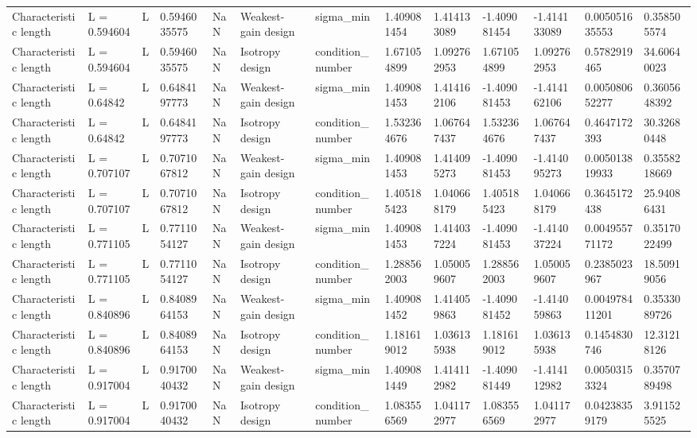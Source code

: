 \begin{tabular}{@{}lllllllllllll@{}}
Characteristic length & L = 0.594604 & L & 0.5946035575 & NaN & Weakest-gain design & sigma\_min & 1.409081454 & 1.414133089 & -1.409081454 & -1.414133089 & 0.005051635553 & 0.358505574 \\
Characteristic length & L = 0.594604 & L & 0.5946035575 & NaN & Isotropy design & condition\_number & 1.671054899 & 1.092762953 & 1.671054899 & 1.092762953 & 0.5782919465 & 34.60640023 \\
Characteristic length & L = 0.64842 & L & 0.6484197773 & NaN & Weakest-gain design & sigma\_min & 1.409081453 & 1.414162106 & -1.409081453 & -1.414162106 & 0.005080652277 & 0.3605648392 \\
Characteristic length & L = 0.64842 & L & 0.6484197773 & NaN & Isotropy design & condition\_number & 1.532364676 & 1.067647437 & 1.532364676 & 1.067647437 & 0.4647172393 & 30.32680448 \\
Characteristic length & L = 0.707107 & L & 0.7071067812 & NaN & Weakest-gain design & sigma\_min & 1.409081453 & 1.414095273 & -1.409081453 & -1.414095273 & 0.005013819933 & 0.3558218669 \\
Characteristic length & L = 0.707107 & L & 0.7071067812 & NaN & Isotropy design & condition\_number & 1.405185423 & 1.040668179 & 1.405185423 & 1.040668179 & 0.3645172438 & 25.94086431 \\
Characteristic length & L = 0.771105 & L & 0.7711054127 & NaN & Weakest-gain design & sigma\_min & 1.409081453 & 1.414037224 & -1.409081453 & -1.414037224 & 0.004955771172 & 0.3517022499 \\
Characteristic length & L = 0.771105 & L & 0.7711054127 & NaN & Isotropy design & condition\_number & 1.288562003 & 1.050059607 & 1.288562003 & 1.050059607 & 0.2385023967 & 18.50919056 \\
Characteristic length & L = 0.840896 & L & 0.8408964153 & NaN & Weakest-gain design & sigma\_min & 1.409081452 & 1.414059863 & -1.409081452 & -1.414059863 & 0.004978411201 & 0.3533089726 \\
Characteristic length & L = 0.840896 & L & 0.8408964153 & NaN & Isotropy design & condition\_number & 1.181619012 & 1.036135938 & 1.181619012 & 1.036135938 & 0.1454830746 & 12.31218126 \\
Characteristic length & L = 0.917004 & L & 0.9170040432 & NaN & Weakest-gain design & sigma\_min & 1.409081449 & 1.414112982 & -1.409081449 & -1.414112982 & 0.00503153324 & 0.3570789498 \\
Characteristic length & L = 0.917004 & L & 0.9170040432 & NaN & Isotropy design & condition\_number & 1.083556569 & 1.041172977 & 1.083556569 & 1.041172977 & 0.04238359179 & 3.911525525 \\

\end{tabular}
